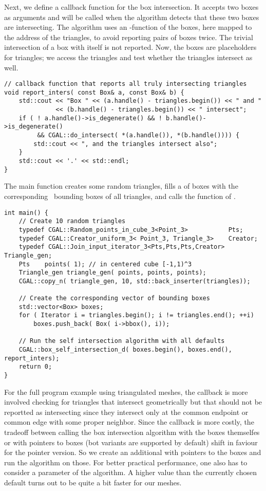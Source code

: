 Next, we define a callback function for the box intersection. It
accepts two boxes as arguments and will be called when the algorithm
detects that these two boxes are intersecting. The algorithm uses an
-function of the boxes, here mapped to the address of the
triangles, to avoid reporting pairs of boxes twice. The trivial
intersection of a box with itself is not reported. Now, the boxes are
placeholders for triangles; we access the triangles and test
whether the triangles intersect as well.

\begin{lstlisting}
// callback function that reports all truly intersecting triangles
void report_inters( const Box& a, const Box& b) {
    std::cout << "Box " << (a.handle() - triangles.begin()) << " and "
              << (b.handle() - triangles.begin()) << " intersect";
    if ( ! a.handle()->is_degenerate() && ! b.handle()->is_degenerate()
         && CGAL::do_intersect( *(a.handle()), *(b.handle()))) {
        std::cout << ", and the triangles intersect also";
    }
    std::cout << '.' << std::endl;
}
\end{lstlisting}

The main function creates some random triangles, fills a
 of boxes with the corresponding \cgal\ bounding
boxes of all triangles, and calls the
 function of \cgal.

\begin{lstlisting}
int main() {
    // Create 10 random triangles
    typedef CGAL::Random_points_in_cube_3<Point_3>           Pts;
    typedef CGAL::Creator_uniform_3< Point_3, Triangle_3>    Creator;
    typedef CGAL::Join_input_iterator_3<Pts,Pts,Pts,Creator> Triangle_gen;
    Pts    points( 1); // in centered cube [-1,1)^3
    Triangle_gen triangle_gen( points, points, points);
    CGAL::copy_n( triangle_gen, 10, std::back_inserter(triangles));

    // Create the corresponding vector of bounding boxes
    std::vector<Box> boxes;
    for ( Iterator i = triangles.begin(); i != triangles.end(); ++i)
        boxes.push_back( Box( i->bbox(), i));
    
    // Run the self intersection algorithm with all defaults
    CGAL::box_self_intersection_d( boxes.begin(), boxes.end(), report_inters);
    return 0;
}
\end{lstlisting}

For the full program example using triangulated meshes, the callback
is more involved checking for triangles that intersect geometrically
but that should not be reportted as intersecting since they intersect
only at the common endpoint or common edge with some proper neighbor.
Since the callback is more costly, the tradeoff between calling the
box intersection algorithm with the boxes themselfes or with pointers
to boxes (bot variants are supported by default) shift in faviour for
the pointer version. So we create an additional 
with pointers to the boxes and run the algorithm on those. For better
practical performance, one also has to consider a 
parameter of the algorithm. A higher value than the currently chosen
default turns out to be quite a bit faster for our meshes.


